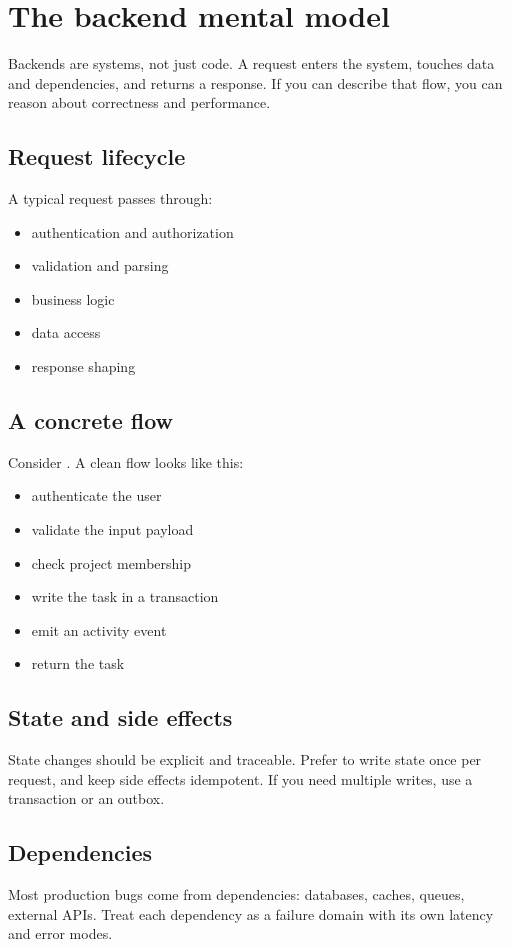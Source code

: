 \chapter{The backend mental model}

Backends are systems, not just code.
A request enters the system, touches data and dependencies, and returns a response.
If you can describe that flow, you can reason about correctness and performance.

\section{Request lifecycle}
A typical request passes through:
\begin{itemize}[nosep]
  \item authentication and authorization
  \item validation and parsing
  \item business logic
  \item data access
  \item response shaping
\end{itemize}

\section{A concrete flow}
Consider .
A clean flow looks like this:
\begin{itemize}[nosep]
  \item authenticate the user
  \item validate the input payload
  \item check project membership
  \item write the task in a transaction
  \item emit an activity event
  \item return the task
\end{itemize}

\section{State and side effects}
State changes should be explicit and traceable.
Prefer to write state once per request, and keep side effects idempotent.
If you need multiple writes, use a transaction or an outbox.

\section{Dependencies}
Most production bugs come from dependencies: databases, caches, queues, external APIs.
Treat each dependency as a failure domain with its own latency and error modes.

